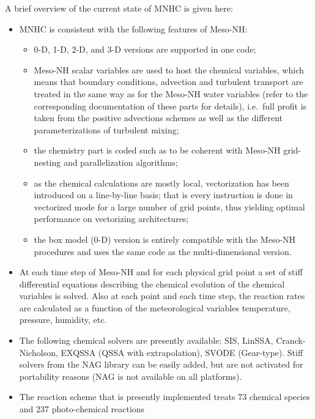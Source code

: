 A brief overview of the current state of MNHC is given here:

\begin{itemize}
\item MNHC is consistent with the following features of Meso-NH:
  \begin{itemize}
    \item 0-D, 1-D, 2-D, and 3-D versions are supported in one code;
    \item Meso-NH scalar variables are used to host the chemical variables,
          which means that boundary conditions, advection and
          turbulent transport are treated in the same way as for the
          Meso-NH water variables (refer to the corresponding documentation
          of these parts for details),
          i.e.~full profit is taken from the positive advections schemes
          as well as the different parameterizations of turbulent mixing;
    \item the chemistry part is coded such as to be coherent
          with Meso-NH grid-nesting and parallelization algorithms;
    \item as the chemical calculations are mostly local, vectorization
          has been introduced on a line-by-line basis; that is
          every instruction is done in vectorized mode for a large
          number of grid points, thus yielding optimal performance
          on vectorizing architectures;
    \item the box model (0-D) version is entirely compatible
          with the Meso-NH procedures
          and uses the same code as the multi-dimensional version.
  \end{itemize}
\item At each time step of Meso-NH and for each physical grid point
      a set of stiff differential equations describing the chemical 
      evolution of the chemical variables is solved.
      Also at each point and each time step, the reaction
      rates are calculated as a function of the meteorological variables
      temperature, pressure, humidity, etc.
\item The following chemical solvers are presently available:
      SIS, LinSSA, Cranck-Nicholson, EXQSSA (QSSA with extrapolation),
      SVODE (Gear-type). Stiff solvers from the NAG library can be easily
      added, but are not activated for portability reasons (NAG is
      not available on all platforms).
\item The reaction scheme 
      that is presently implemented treats 73 chemical
      species and 237 photo-chemical reactions 

\end{itemize}
